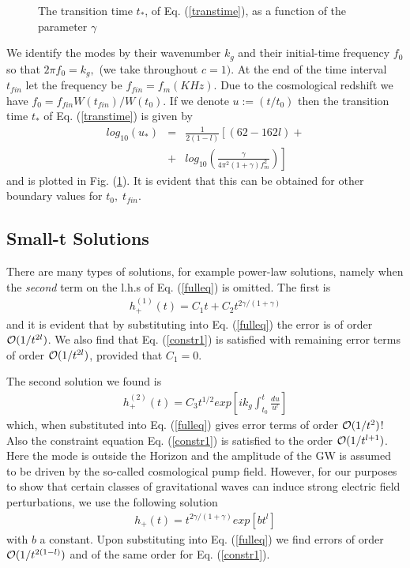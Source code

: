 \documentclass[prd,twocolumn,showpacs,preprintnumbers,amsmath,amssy mb]{revtex4}
\newcommand{\bea}{\begin{eqnarray}}
\newcommand{\eea}{\end{eqnarray}}
\newcommand{\nn}{\nonumber}
\begin{document}
\begin{figure}
\caption{The transition time $t_{*}$, of Eq. (\ref{transtime}), 
as a function of the parameter $\gamma $}
\label{transtf}
\end{figure}

We identify the modes by their wavenumber $k_{g}$ and their 
initial-time frequency $f_{0}$ so that 
$2\pi f_{0}=k_{g},$ (we take throughout $c=1)$. At the end of the 
time interval $t_{fin}$ let the frequency be $f_{fin}=f_{m}(KHz)$. 
Due to the cosmological redshift we have $f_{0}=f_{fin}W(t_{fin})/W(t_{0})$. 
If we denote $u:=(t/t_{0})$ then the transition time $t_{*}$ of 
Eq. (\ref{transtime}) is given by 
\bea 
\label{transtime1}
log_{10}(u_{*})&=&\frac{1}{2(1-l)}
\left[(62-162l)+\right. \nn \\
&+&\left.log_{10}\left(\frac{\gamma }{4\pi ^{2}(1+\gamma )f_{m}^{2}}\right)\right]
\eea
and is plotted in Fig. (\ref{transtf}). It is evident that this can 
be obtained for other boundary values for $t_{0},\; t_{fin}$. 



\subsection{Small-t Solutions}

There are many types of solutions, for example power-law 
solutions, namely when the {\it second} term on 
the l.h.s of Eq. (\ref{fulleq}) is omitted. The first is 
\bea 
\label{fstsmall}
h_{+}^{(1)}(t)=C_{1}t+C_{2}t^{2\gamma /(1+\gamma )}
\eea
and it is evident that by substituting into Eq. (\ref{fulleq}) 
the error is of order ${\cal O}(1/t^{2l})$. We also find that 
Eq. (\ref{constr1}) is satisfied with remaining error terms of 
order ${\cal O}(1/t^{2l})$, provided that $C_{1}=0$. 

The second solution we found is 
\bea 
\label{sndsmall}
h_{+}^{(2)}(t)=C_{3}t^{1/2}exp
\left[ik_{g}\int_{t_{0}}^{t}\frac{du}{u^{l}}\right]
\eea
which, when substituted into Eq. (\ref{fulleq}) gives error terms 
of order ${\cal O}(1/t^{2})$! Also the constraint equation 
Eq. (\ref{constr1}) is satisfied to the order ${\cal O}(1/t^{l+1})$. 
Here the mode is outside the 
Horizon and the amplitude of the GW is assumed to be driven by 
the so-called cosmological pump field. However, for our purposes 
to show that certain classes of gravitational waves can induce 
strong electric field perturbations, 
we use the following solution
\bea 
\label{thrdsmall}
h_{+}(t)=t^{2\gamma /(1+\gamma )}exp
\left[bt^{l}\right]
\eea
with $b$ a constant. Upon substituting into Eq. (\ref{fulleq}) 
we find errors of order ${\cal O}(1/t^{2(1-l)})$ and of the same 
order for Eq. (\ref{constr1}).
\end{document}
